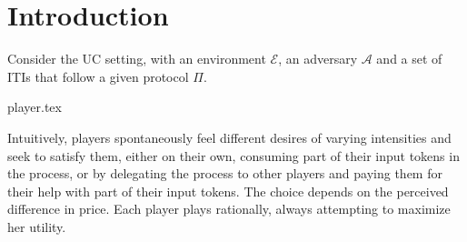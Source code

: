\section{Introduction}
  Consider the UC setting, with an environment $\mathcal{E}$, an adversary $\mathcal{A}$
  and a set of ITIs that follow a given protocol $\Pi$.

  {player.tex}

  Intuitively, players spontaneously feel different desires of varying intensities and
  seek to satisfy them, either on their own, consuming part of their input tokens in the
  process, or by delegating the process to other players and paying them for their help
  with part of their input tokens. The choice depends on the perceived difference in
  price. Each player plays rationally, always attempting to maximize her utility.
